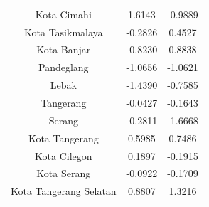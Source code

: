 \begin{longtable}{|c|c|c|}
Kota Cimahi & 1.6143 & -0.9889 \\
Kota Tasikmalaya & -0.2826 & 0.4527 \\
Kota Banjar & -0.8230 & 0.8838 \\
Pandeglang & -1.0656 & -1.0621 \\
Lebak & -1.4390 & -0.7585 \\
Tangerang & -0.0427 & -0.1643 \\
Serang & -0.2811 & -1.6668 \\
Kota Tangerang & 0.5985 & 0.7486 \\
Kota Cilegon & 0.1897 & -0.1915 \\
Kota Serang & -0.0922 & -0.1709 \\
Kota Tangerang Selatan & 0.8807 & 1.3216 \\
\hline
\end{longtable}